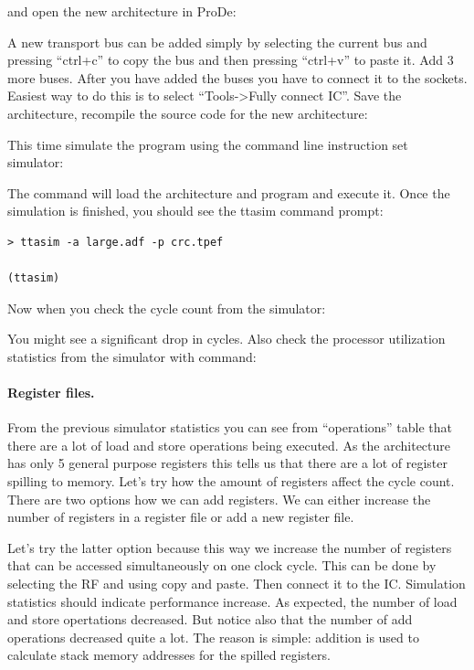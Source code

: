 \documentclass[twoside]{tceusermanual}
\begin{document}

and open the new architecture in ProDe:


A new transport bus can be added simply by selecting the current bus and
pressing ``ctrl+c'' to copy the bus and then pressing ``ctrl+v'' to paste it.
Add 3 more buses. After you have added the buses you have to connect it to the
sockets. Easiest way to do this is to select ``Tools->Fully connect IC''.
Save the architecture, recompile the source code for the new architecture:


This time simulate the program using the command line instruction set simulator:


The command will load the architecture and program and execute
it. Once the simulation is finished, you should see the ttasim command prompt:

\begin{verbatim}
> ttasim -a large.adf -p crc.tpef

(ttasim) 
\end{verbatim}

Now when you check the cycle count from the simulator:


You might see a significant drop in cycles. 
Also check the processor utilization statistics from the simulator
with command:


\paragraph{Register files.}

From the previous simulator statistics you can see from ``operations'' table
that there are a lot of load and store operations being executed. As the
architecture has only 5 general purpose registers this tells us that there
are a lot of register spilling to memory. Let's try how the amount of registers affect
the cycle count. There are two options how we can add registers. We can either
increase the number of registers in a register file or add a new register file.

Let's try the latter option because this way we increase the number of registers
that can be accessed simultaneously on one clock cycle. This can be done by
selecting the RF and using copy and paste. Then connect it to the IC.
Simulation statistics should indicate performance increase. As expected, the
number of load and store opertations decreased. But notice also that the number
of add operations decreased quite a lot. The reason is simple: addition is used
to calculate stack memory addresses for the spilled registers.
\end{document}
